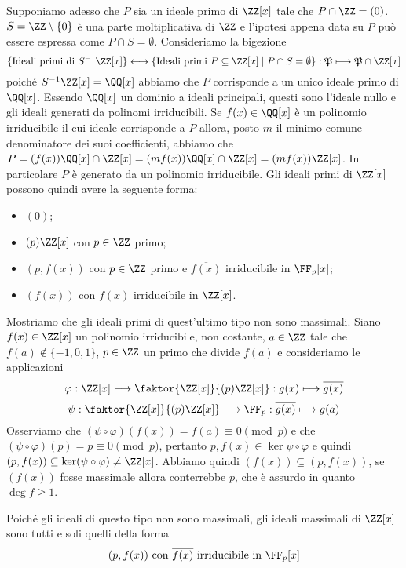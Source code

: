 \documentclass[11pt]{scrartcl}
\begin{document}
	Supponiamo adesso che $P$ sia un ideale primo di $\ZZ[x]$ tale che 
	$P \cap \ZZ = (0)$. $S = \ZZ\setminus \{0\}$ è una parte moltiplicativa di 
	$\ZZ$ e l'ipotesi appena data su $P$ può essere espressa come $P \cap S = \emptyset$.
	Consideriamo la bigezione 
	\[
	\{\text{Ideali primi di }S^{-1}\ZZ[x]\}\longleftrightarrow 
	\{\text{Ideali primi } P\subseteq \ZZ[x] \mid P\cap S = \emptyset\}: 
	\mathfrak{P}\longmapsto \mathfrak{P}\cap\ZZ[x]
	\]
	poiché $S^{-1}\ZZ[x] = \QQ[x]$ abbiamo che $P$ corrisponde a un unico ideale
	primo di $\QQ[x]$. Essendo $\QQ[x]$ un dominio a ideali principali, questi sono
	l'ideale nullo e gli ideali generati da polinomi irriducibili. Se $f(x)\in \QQ[x]$
	è un polinomio irriducibile il cui ideale corrisponde a $P$ allora, posto 
	$m$ il minimo comune denominatore dei suoi coefficienti, abbiamo che 
	$P = (f(x))\QQ[x] \cap \ZZ[x] = (mf(x))\QQ[x]\cap\ZZ[x] = (mf(x))\ZZ[x]$. 
	In particolare $P$ è generato da un polinomio irriducibile.
	Gli ideali primi di $\ZZ[x]$ possono quindi avere la seguente forma:
	\begin{itemize}
		\item $(0)$;
		\item $(p)\ZZ[x]$ con $p \in \ZZ$ primo;
		\item $(p, f(x))$ con $p \in \ZZ$ primo e $\overline{f(x)}$ irriducibile
		in $\FF_p[x]$;
		\item $(f(x))$ con $f(x)$ irriducibile in $\ZZ[x]$.
	\end{itemize}
	
	Mostriamo che gli ideali primi di quest'ultimo tipo non sono massimali.\newline
	Siano $f(x) \in \ZZ[x]$ un polinomio irriducibile, non costante,
	$a \in \ZZ$ tale che $f(a) \notin\{-1, 0, 1\}$, $p \in \ZZ$ un primo che 
	divide $f(a)$ e consideriamo le applicazioni
	\[
	\varphi: \ZZ[x]\longrightarrow \faktor{\ZZ[x]}{(p)\ZZ[x]}: 
	g(x)\longmapsto \overline{g(x)}
	\] 
	\[
	\psi: \faktor{\ZZ[x]}{(p)\ZZ[x]}\longrightarrow \FF_p: 
	\overline{g(x)}\longmapsto g(a)
	\]
	Osserviamo che $(\psi\circ\varphi)(f(x)) = f(a) \equiv 0 \pmod{p}$ e che 
	$(\psi\circ\varphi)(p) = p \equiv 0 \pmod{p}$, pertanto $p, f(x) \in 
	\ker{\psi\circ\varphi}$ e quindi $(p, f(x)) \subseteq \ker(\psi\circ \varphi) \neq \ZZ[x]$.
	Abbiamo quindi $(f(x)) \subseteq (p, f(x))$, se $(f(x))$ fosse massimale allora
	conterrebbe $p$, che è assurdo in quanto $\deg f \geq 1$.
	
	Poiché gli ideali di questo tipo non sono massimali, gli ideali massimali di
	$\ZZ[x]$ sono tutti e soli quelli della forma
	\[
	(p, f(x)) \text{ con }\overline{f(x)} \text{ irriducibile in }\FF_p[x]
	\]
	
\end{document}

